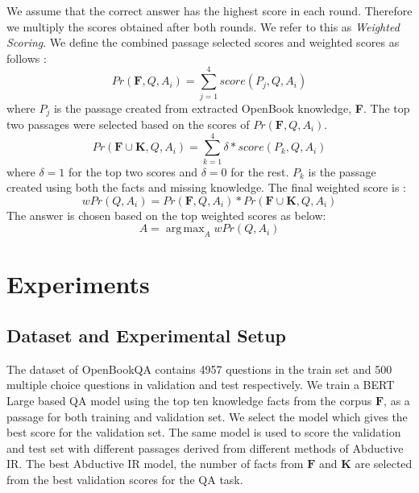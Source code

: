 \documentclass[11pt,a4paper]{article}
\DeclareMathOperator*{\argmax}{arg\,max}
\begin{document}
We assume that the correct answer has the highest score in each round. Therefore we multiply the scores obtained after both rounds. We refer to this as \textit{Weighted Scoring}.
We define the combined passage selected scores and weighted scores as follows :
\begin{equation*}
    Pr(\mathbf{F},Q,A_i) = \sum_{j=1}^{4}{score(P_j,Q,A_i)}
\end{equation*} where $P_j$ is the passage created from extracted OpenBook knowledge, \textbf{F}. The top two passages were selected based on the scores of  $Pr(\mathbf{F},Q,A_i)$. 
\begin{equation*}
    Pr(\mathbf{F}\cup \mathbf{K},Q,A_i) = \sum_{k=1}^{4}{\delta * score(P_k,Q,A_i)}
\end{equation*}
where $\delta=1$ for the top two scores and $\delta=0$ for the rest. $P_k$ is the passage created using both the facts and missing knowledge. The final weighted score is :
\begin{equation*}
        wPr(Q,A_i) = Pr(\mathbf{F},Q,A_i) * Pr(\mathbf{F} \cup \mathbf{K},Q,A_i)
\end{equation*}
The answer is chosen based on the top weighted scores as below:
\begin{equation*}
A = \argmax_A  wPr(Q,A_i)
\end{equation*}


\section{Experiments}


\subsection{Dataset and Experimental Setup}
The dataset of OpenBookQA contains 4957 questions in the train set and 500 multiple choice questions in validation and test respectively.
We train a BERT Large based QA model using the top ten knowledge facts from the corpus $\mathbf{F}$, as a passage for both training and validation set. We select the model which gives the best score for the validation set. The same model is used to score the validation and test set with different passages derived from different methods of Abductive IR. The best Abductive IR model, the number of facts from $\mathbf{F}$ and $\mathbf{K}$ are selected from the best validation scores for the QA task.  
\end{document}
